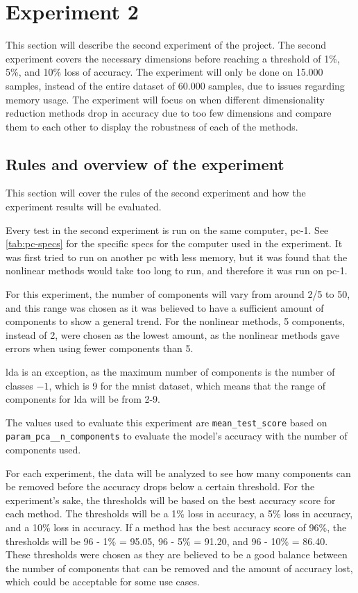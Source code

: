 \section{Experiment 2}\label{sec:experiment-2}
This section will describe the second experiment of the project. The second experiment covers the necessary dimensions before reaching a threshold of 1\%, 5\%, and 10\% loss of accuracy. The experiment will only be done on 15.000 samples, instead of the entire dataset of 60.000 samples, due to issues regarding memory usage. The experiment will focus on when different dimensionality reduction methods drop in accuracy due to too few dimensions and compare them to each other to display the robustness of each of the methods.


\subsection{Rules and overview of the experiment}\label{subsec:experiment_2_rules}
This section will cover the rules of the second experiment and how the experiment results will be evaluated.

Every test in the second experiment is run on the same computer, pc-1. See \autoref{tab:pc-specs} for the specific specs for the computer used in the experiment. It was first tried to run on another pc with less memory, but it was found that the nonlinear methods would take too long to run, and therefore it was run on pc-1.

For this experiment, the number of components will vary from around 2/5 to 50, and this range was chosen as it was believed to have a sufficient amount of components to show a general trend. For the nonlinear methods, 5 components, instead of 2, were chosen as the lowest amount, as the nonlinear methods gave errors when using fewer components than 5.

\gls{lda} is an exception, as the maximum number of components is the number of classes $-1$, which is 9 for the \gls{mnist} dataset, which means that the range of components for \gls{lda} will be from 2-9.

The values used to evaluate this experiment are \texttt{mean\_test\_score} based on \texttt{param\_pca\_\_n\_components} to evaluate the model's accuracy with the number of components used.

For each experiment, the data will be analyzed to see how many components can be removed before the accuracy drops below a certain threshold. For the experiment's sake, the thresholds will be based on the best accuracy score for each method. The thresholds will be a 1\% loss in accuracy, a 5\% loss in accuracy, and a 10\% loss in accuracy. If a method has the best accuracy score of 96\%, the thresholds will be 96 - 1\% = 95.05, 96 - 5\% = 91.20, and 96 - 10\% = 86.40. These thresholds were chosen as they are believed to be a good balance between the number of components that can be removed and the amount of accuracy lost, which could be acceptable for some use cases.


